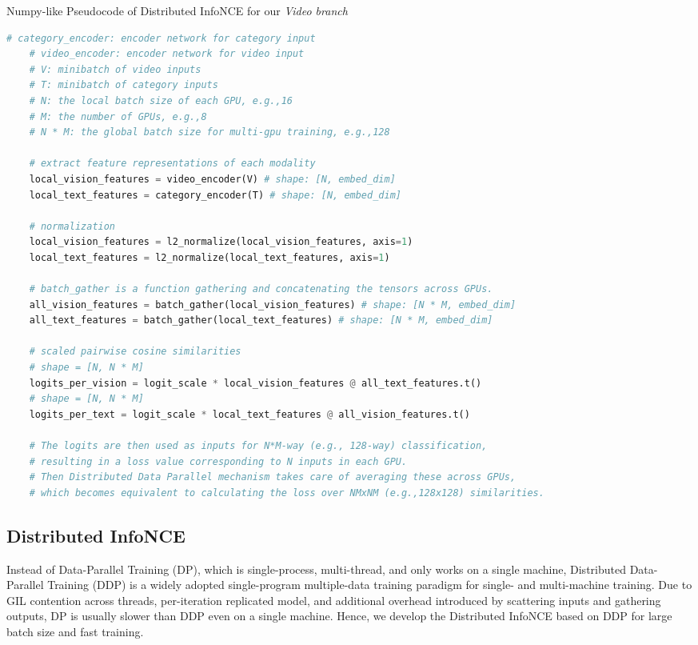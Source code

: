 \documentclass[10pt,twocolumn,letterpaper]{article}
\begin{document}
\begin{algorithm*}[h]
	\caption{Numpy-like Pseudocode of Distributed InfoNCE for our \emph{Video branch}}
	\label{batch_gather}
	\begin{lstlisting}[language=python]
    # category_encoder: encoder network for category input
    # video_encoder: encoder network for video input
    # V: minibatch of video inputs
    # T: minibatch of category inputs
    # N: the local batch size of each GPU, e.g.,16
    # M: the number of GPUs, e.g.,8
    # N * M: the global batch size for multi-gpu training, e.g.,128
    
    # extract feature representations of each modality
    local_vision_features = video_encoder(V) # shape: [N, embed_dim]
    local_text_features = category_encoder(T) # shape: [N, embed_dim]

    # normalization
    local_vision_features = l2_normalize(local_vision_features, axis=1)
    local_text_features = l2_normalize(local_text_features, axis=1)
    
    # batch_gather is a function gathering and concatenating the tensors across GPUs. 
    all_vision_features = batch_gather(local_vision_features) # shape: [N * M, embed_dim]
    all_text_features = batch_gather(local_text_features) # shape: [N * M, embed_dim]
    
    # scaled pairwise cosine similarities
    # shape = [N, N * M]
    logits_per_vision = logit_scale * local_vision_features @ all_text_features.t()  
    # shape = [N, N * M]
    logits_per_text = logit_scale * local_text_features @ all_vision_features.t() 
    
    # The logits are then used as inputs for N*M-way (e.g., 128-way) classification, 
    # resulting in a loss value corresponding to N inputs in each GPU. 
    # Then Distributed Data Parallel mechanism takes care of averaging these across GPUs, 
    # which becomes equivalent to calculating the loss over NMxNM (e.g.,128x128) similarities.
	\end{lstlisting}
\end{algorithm*}






\subsection{Distributed InfoNCE}\label{sec:batch_gather}
\label{sm:batch_gather}
Instead of Data-Parallel Training (DP), which is single-process, multi-thread, and only works on a single machine, Distributed Data-Parallel Training (DDP) is a widely adopted single-program multiple-data training paradigm for single- and multi-machine training.
Due to GIL contention across threads, per-iteration replicated model, and additional overhead introduced by scattering inputs and gathering outputs, DP is usually slower than DDP even on a single machine.
Hence, we develop the Distributed InfoNCE based on DDP for large batch size and fast training.
\end{document}
